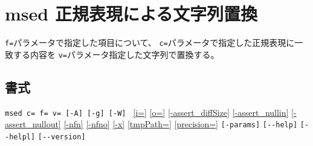 
%

\section{msed 正規表現による文字列置換\label{sect:msed}}
\verb|f=|パラメータで指定した項目について、
\verb|c=|パラメータで指定した正規表現に一致する内容を
\verb|v=|パラメータ指定した文字列で置換する。

\subsection*{書式}
\verb|msed c= f= v= [-A] [-g] [-W] |     
\hyperref[sect:option_i]{[i=]}
\hyperref[sect:option_o]{[o=]}
\hyperref[sect:option_assert_diffSize]{[-assert\_diffSize]}
\hyperref[sect:option_assert_nullin]{[-assert\_nullin]}
\hyperref[sect:option_assert_nullout]{[-assert\_nullout]}
\hyperref[sect:option_nfn]{[-nfn]} 
\hyperref[sect:option_nfno]{[-nfno]}  
\hyperref[sect:option_x]{[-x]}
\hyperref[sect:option_option_tmppath]{[tmpPath=]}
\hyperref[sect:option_precision]{[precision=]}
\verb|[-params]|
\verb|[--help]|
\verb|[--helpl]|
\verb|[--version]|\\

